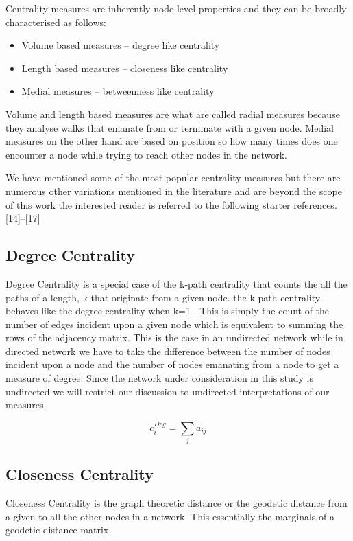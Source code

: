 Centrality measures are inherently node level properties and they can be broadly characterised as follows: \cite{Borgatti2006, Borgatti2005}
\\
\begin{itemize}
    \item Volume based measures – degree like centrality
    \item Length based measures – closeness like centrality
    \item Medial measures – betweenness like centrality 
\end{itemize}

Volume and length based measures are what are called radial measures because they analyse walks that emanate from or terminate with a given node. Medial measures on the other hand are based on position so how many times does one encounter a node while trying to reach other nodes in the network. 

We have mentioned some of the most popular centrality measures but there are numerous other variations mentioned in the literature and are beyond the scope of this work the interested reader is referred to the following starter references.[14]–[17]

\subsection{Degree Centrality}

Degree Centrality is a special case of the k-path centrality that counts the all the paths of a length, k that originate from a given node. the k path centrality behaves like the degree centrality when k=1 . This is simply the count of the number of edges incident upon a given node which is equivalent to summing the rows of the adjacency matrix. This is the case in an undirected network while in directed network we have to take the difference between the number of nodes incident upon a node and the number of nodes emanating from a node to get a measure of degree. Since the network under consideration in this study is undirected we will restrict our discussion to undirected interpretations of our measures.  \cite{Borgatti2006}

\begin{equation}
    c_i^{Deg}= \sum_j a_{ij} 
\end{equation}

\subsection{Closeness Centrality}
Closeness Centrality is the graph theoretic distance or the geodetic distance from a given to all the other nodes in a network. This essentially the marginals of a geodetic distance matrix. \cite{Borgatti2006, Borgatti2005}

